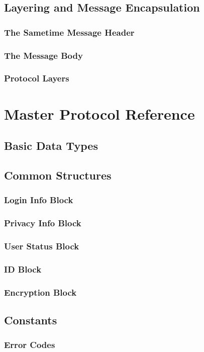 \documentclass[titlepage,oneside]{book}
\begin{document}
\section{Layering and Message Encapsulation}
\subsection{The Sametime Message Header}
\subsection{The Message Body}
\subsection{Protocol Layers}

\chapter{Master Protocol Reference}
\section{Basic Data Types}
\section{Common Structures}
\subsection{Login Info Block}
\subsection{Privacy Info Block}
\subsection{User Status Block}
\subsection{ID Block}
\subsection{Encryption Block}

\section{Constants}
\subsection{Error Codes}
\end{document}
